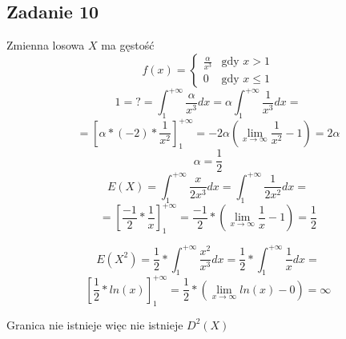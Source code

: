 \subsection{Zadanie 10}

Zmienna losowa $X$ ma gęstość 
$$
f(x)
 = \left\{ \begin{array}{ll}
 \frac{\alpha}{x^3} & \text{gdy } x > 1\\
0 & \text{gdy }x \leq 1
\end{array} \right.
$$
$$
1 = ? = \int_{1}^{+\infty} \frac{\alpha}{x^3} dx = \alpha \int_{1}^{+\infty} \frac{1}{x^3}dx =
$$
$$
= [\alpha * (-2) *  \frac{1}{x^2} ]_{1}^{+\infty} = -2 \alpha (\lim_{x \to \infty} \frac{1}{x^2} - 1) = 2 \alpha
$$
$$
\alpha = \frac{1}{2}
$$
$$
E(X) = \int_{1}^{+\infty} \frac{x}{2x^3}dx =  \int_{1}^{+\infty} \frac{1}{2x^2}dx =
$$
$$
= [\frac{-1}{2} * \frac{1}{x}]_{1}^{+\infty} = \frac{-1}{2} * (\lim_{x \to \infty} \frac{1}{x} - 1) = \frac{1}{2}
$$
$$
$$

$$
E(X^2) = \frac{1}{2} * \int_{1}^{+\infty} \frac{x^2}{x^3}dx =  \frac{1}{2} * \int_{1}^{+\infty} \frac{1}{x}dx = 
$$
$$
[\frac{1}{2} * ln(x)] _{1}^{+\infty} = \frac{1}{2} * (\lim_{x \to \infty} ln(x) - 0 ) = \infty
$$

Granica nie istnieje więc nie istnieje $D^2(X)$
